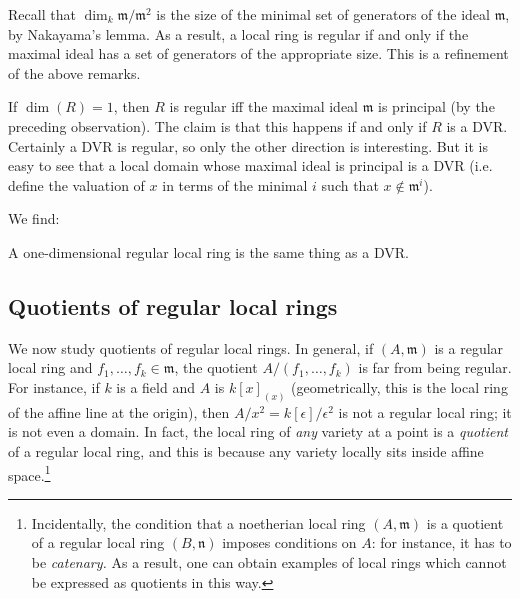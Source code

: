 Recall that $\dim_k \mathfrak{m}/\mathfrak{m}^2$ is the size of the minimal set
of generators of the ideal $\mathfrak{m}$, by Nakayama's lemma. As a result, a
local ring is regular if and only if the maximal ideal has a set of generators
of the appropriate size. This is a refinement of the above remarks.

\begin{example} 
If $\dim(R) =1$, then $R$ is regular iff the maximal ideal $\mathfrak{m}$ is
principal (by the preceding observation). 
The claim is that this happens if and only if $R$ is  a DVR. Certainly a DVR is
regular, so only the other direction is interesting. 
But it is easy to see that a local domain whose maximal ideal is principal is a
DVR (i.e. define the valuation of $x$ in terms of the minimal $i$ such that $x
\notin \mathfrak{m}^i$).
\end{example} 
We find:
\begin{proposition} 
A one-dimensional regular local ring is the same thing as a DVR.
\end{proposition} 


\subsection{Quotients of regular local rings}

We now study quotients of regular local rings. 
In general, if $(A, \mathfrak{m})$ is a regular local ring and $f_1, \dots, f_k \in
\mathfrak{m}$, the quotient $A/(f_1, \dots, f_k)$ is far from being regular. 
For instance, if $k$ is a field and $A$ is $k[x]_{(x)}$ (geometrically, this is
the local ring of the affine line at the origin), then $A/x^2 =
k[\epsilon]/\epsilon^2$ is not a regular local ring; it is not even a domain. 
In fact, the local ring of \emph{any} variety at a point is a \emph{quotient} of a
regular local ring, and this is because any variety locally sits inside affine
space.\footnote{Incidentally, the condition that a noetherian local ring $(A,
\mathfrak{m})$ is a
quotient of a regular local ring  $(B, \mathfrak{n})$ imposes conditions on
$A$: for instance, it has to be \emph{catenary.} As a result, one can obtain
examples of local rings which cannot be expressed as quotients in this way.}

